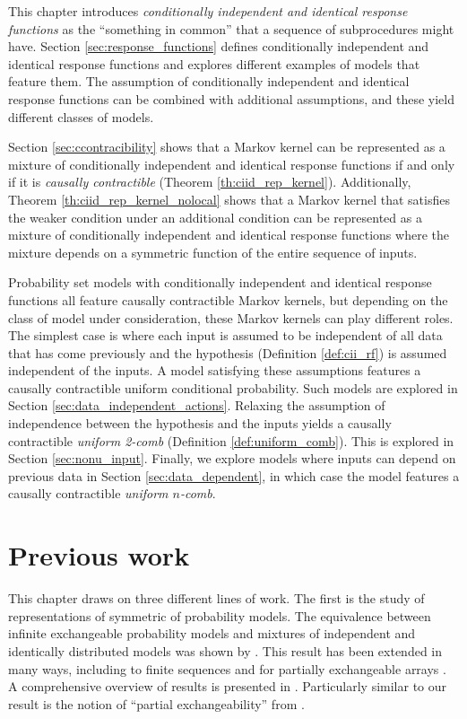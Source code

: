 This chapter introduces \emph{conditionally independent and identical response functions} as the ``something in common'' that a sequence of subprocedures might have. Section \ref{sec:response_functions} defines conditionally independent and identical response functions and explores different examples of models that feature them. The assumption of conditionally independent and identical response functions can be combined with additional assumptions, and these yield different classes of models.

Section \ref{sec:ccontracibility} shows that a Markov kernel can be represented as a mixture of conditionally independent and identical response functions if and only if it is \emph{causally contractible} (Theorem \ref{th:ciid_rep_kernel}). Additionally, Theorem \ref{th:ciid_rep_kernel_nolocal} shows that a Markov kernel that satisfies the weaker condition under an additional condition can be represented as a mixture of conditionally independent and identical response functions where the mixture depends on a symmetric function of the entire sequence of inputs.

Probability set models with conditionally independent and identical response functions all feature causally contractible Markov kernels, but depending on the class of model under consideration, these Markov kernels can play different roles. The simplest case is where each input is assumed to be independent of all data that has come previously and the hypothesis (Definition \ref{def:cii_rf}) is assumed independent of the inputs. A model satisfying these assumptions features a causally contractible uniform conditional probability. Such models are explored in Section \ref{sec:data_independent_actions}. Relaxing the assumption of independence between the hypothesis and the inputs yields a causally contractible \emph{uniform 2-comb} (Definition \ref{def:uniform_comb}). This is explored in Section \ref{sec:nonu_input}. Finally, we explore models where inputs can depend on previous data in Section \ref{sec:data_dependent}, in which case the model features a causally contractible \emph{uniform $n$-comb}.

\section{Previous work}\label{sec:prev_work}

This chapter draws on three different lines of work. The first is the study of representations of symmetric of probability models. The equivalence between infinite exchangeable probability models and mixtures of independent and identically distributed models was shown by \cite{de_finetti_foresight_1992}. This result has been extended in many ways, including to finite sequences \citet{kerns_definettis_2006,diaconis_finite_1980} and for partially exchangeable arrays \citet{aldous_representations_1981}. A comprehensive overview of results is presented in \citet{kallenberg_probabilistic_2005}. Particularly similar to our result is the notion of ``partial exchangeability'' from \citet{diaconis_recent_1988}.

